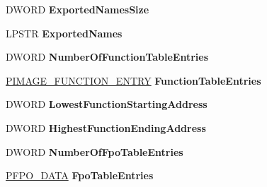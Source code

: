 \begin{DoxyCompactItemize}
D\+W\+O\+RD {\bfseries Exported\+Names\+Size}
\item 
\mbox{\label{struct___i_m_a_g_e___d_e_b_u_g___i_n_f_o_r_m_a_t_i_o_n_a704ad40d1f9f9fcb6f8abb85b65875d1}} 
L\+P\+S\+TR {\bfseries Exported\+Names}
\item 
\mbox{\label{struct___i_m_a_g_e___d_e_b_u_g___i_n_f_o_r_m_a_t_i_o_n_acf0f4e8ee3073eb284306a7294f8ed34}} 
D\+W\+O\+RD {\bfseries Number\+Of\+Function\+Table\+Entries}
\item 
\mbox{\label{struct___i_m_a_g_e___d_e_b_u_g___i_n_f_o_r_m_a_t_i_o_n_abf6dfe46bad99b87a803a558e4788658}} 
\hyperlink{struct___i_m_a_g_e___f_u_n_c_t_i_o_n___e_n_t_r_y}{P\+I\+M\+A\+G\+E\+\_\+\+F\+U\+N\+C\+T\+I\+O\+N\+\_\+\+E\+N\+T\+RY} {\bfseries Function\+Table\+Entries}
\item 
\mbox{\label{struct___i_m_a_g_e___d_e_b_u_g___i_n_f_o_r_m_a_t_i_o_n_a0766f553684a13e081ec3e8a12ac5d28}} 
D\+W\+O\+RD {\bfseries Lowest\+Function\+Starting\+Address}
\item 
\mbox{\label{struct___i_m_a_g_e___d_e_b_u_g___i_n_f_o_r_m_a_t_i_o_n_a7d6f33d25dc104cff05c65a15806faa5}} 
D\+W\+O\+RD {\bfseries Highest\+Function\+Ending\+Address}
\item 
\mbox{\label{struct___i_m_a_g_e___d_e_b_u_g___i_n_f_o_r_m_a_t_i_o_n_a4e8ac92b9d4c12b41e0c2ab2384896fb}} 
D\+W\+O\+RD {\bfseries Number\+Of\+Fpo\+Table\+Entries}
\item 
\mbox{\label{struct___i_m_a_g_e___d_e_b_u_g___i_n_f_o_r_m_a_t_i_o_n_aaa814b5fb45657f5fe7ef48be27bbf94}} 
\hyperlink{struct___f_p_o___d_a_t_a}{P\+F\+P\+O\+\_\+\+D\+A\+TA} {\bfseries Fpo\+Table\+Entries}
\item 
\mbox{\label{struct___i_m_a_g_e___d_e_b_u_g___i_n_f_o_r_m_a_t_i_o_n_ae3cbb616b0a469d77f60c9dba9f4e650}} 

\end{DoxyCompactItemize}
